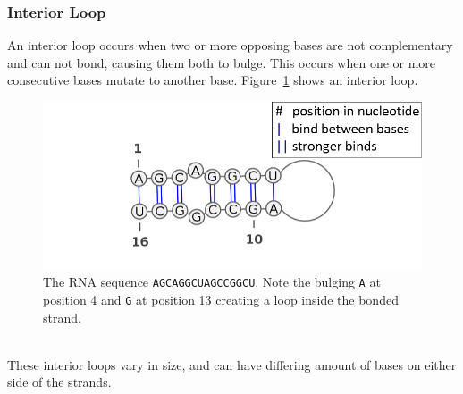 \subsubsection{Interior Loop}
An interior loop occurs when two or more opposing bases are not complementary and 
can not bond, causing them both to bulge. This occurs when one or more 
consecutive bases mutate to another base. Figure~\ref{fig:int-loop} shows an interior 
loop.
\begin{figure}[h!]
\centering
\includegraphics[scale=0.4]{./lib/interior-loop.png}
\caption{The RNA sequence {\tt AGCAGGCUAGCCGGCU}. Note the bulging {\tt A} at position 4 and {\tt G} at position 13
creating a loop inside the bonded strand.}
\label{fig:int-loop}
\end{figure}\\
These interior loops vary in size, and can have differing amount of bases on 
either side of the strands.
